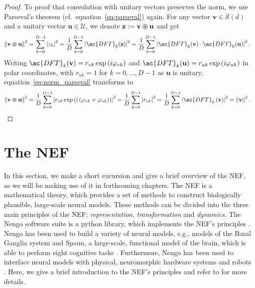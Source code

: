 \begin{proof}
    To proof that convolution with unitary vectors preserves the norm, we use Parseval's theorem (cf.\ equation~\eqref{eq:parseval}) again.
	For any vector $ \mathbf{v} \in \mathcal{S}(d)$ and  a unitary vector $ \mathbf{u} \in \mathcal{U}$, we denote $ \mathbf{z}:=  \mathbf{v} \varoast \mathbf{u}$ and get
	\begin{equation}
	\label{eq:norm_parseval}
	\norm{ \mathbf{v} \varoast \mathbf{u}}^{2} = \sum_{k=0}^{D-1} \left|z_{k}\right|^{2} = \frac{1}{D} \sum_{k=0}^{D-1} \left|\ac{DFT}_{k}( \mathbf{z})\right|^{2} = \frac{1}{D} \sum_{k=0}^{D-1} \left|\ac{DFT}_{k}( \mathbf{v}) \cdot \ac{DFT}_{k}( \mathbf{u})\right|^{2}.
	\end{equation}
	Writing $\ac{DFT}_{k}( \mathbf{v}) = r_{vk}\exp\left(i\varphi_{vk}\right)$ and $\ac{DFT}_{k}( \mathbf{u}) = r_{uk}\exp\left(i\varphi_{uk}\right)$ in polar coordinates, with $r_{uk} = 1$ for $k=0, \ldots, D-1$ as $ \mathbf{u}$ is unitary, equation~\eqref{eq:norm_parseval} transforms to
	\begin{equation*}
	\norm{ \mathbf{v} \varoast \mathbf{u}}^{2} = \frac{1}{D} \sum_{k=0}^{D-1} \left|r_{vk} \exp\left(i\left(\varphi_{vk} + \varphi_{uk}\right)\right)\right|^{2} = \frac{1}{D} \sum_{k=0}^{D-1} \left|r_{vk}\right|^{2} = \frac{1}{D} \sum_{k=0}^{D-1} \left|\ac{DFT}_k\left( \mathbf{v}\right)\right|^{2} = \norm{ \mathbf{v}}^{2}.
	\end{equation*}
\end{proof}

\section{The \acl{NEF}}
\label{sec:neural_eng}

In this section, we make a short excursion and give a brief overview of the \acf{NEF}, as we will be making use of it in forthcoming chapters.
The \ac{NEF} \parencite{Eliasmith2003} is a mathematical theory, which provides a set of methods to construct biologically plausible, large-scale neural models.
These methods can be divided into the three main principles of the \ac{NEF}: \emph{representation}, \emph{transformation} and \emph{dynamics}.
The \ac{Nengo}  software suite is a python library, which implements the \ac{NEF}'s principles \parencite{Bekolay2014}.
\ac{Nengo} has been used to build a variety of neural models, e.g., models of the Basal Ganglia system \parencite{Stewart2010, Stewart2012} and \acf{Spaun}, a large-scale, functional model of the brain, which is able to perform eight cognitive tasks \parencite{Eliasmith2012}.
Furthermore, \ac{Nengo} has been used to interface neural models with physical, neuromorphic hardware systems and robots \parencites{Conradt2014, Stewart2016}.
Here, we give a brief introduction to the \ac{NEF}'s principles and refer to \textcite{Eliasmith2003, Eliasmith2013, Bekolay2014} for more details.
